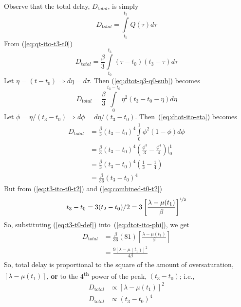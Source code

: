 \documentclass[12pt]{report}
\begin{document}
Observe that the total delay, $D_{\mathrm total}$, is simply
\begin{equation}
  \label{eq:dtot-def}
  D_{\mathrm total} = \int\limits_{t_0}^{t_3}Q(\tau)d\tau
\end{equation}
From (\ref{eq:qt-ito-t3-t0})
\begin{equation}
  \label{eq:dtot-q3-q0-sub}
  D_{\mathrm total} = \frac{\beta}{3}\int\limits_{t_0}^{t_3}(\tau-t_0)(t_3-\tau)d\tau
\end{equation}
Let $\eta = (t-t_0) \Rightarrow d\eta = d\tau$.  Then (\ref{eq:dtot-q3-q0-sub}) becomes
\begin{equation}
  \label{eq:dtot-ito-eta}
  D_{\mathrm total} = \frac{\beta}{3}\int\limits_{0}^{t_3-t_0}\eta^2(t_3-t_0-\eta)d\eta
\end{equation}
Let $\phi = \eta/(t_3-t_0) \Rightarrow d\phi = d\eta/(t_3-t_0)$.
Then~(\ref{eq:dtot-ito-eta}) becomes
\begin{equation}
  \label{eq:dtot-ito-phi}
  \begin{split}
    D_{\mathrm total} & = \frac{\beta}{3}(t_3-t_0)^4\int\limits_{0}^{1}\phi^2(1-\phi)d\phi \\
    & = \frac{\beta}{3}(t_3-t_0)^4\left(\frac{\phi^3}{3}-\frac{\phi^4}{4}\right)\Biggr\rvert_{0}^{1} \\
  & = \frac{\beta}{3}(t_3-t_0)^4\left(\frac{1}{3}-\frac{1}{4}\right) \\
  & = \frac{\beta}{36}(t_3-t_0)^4
  \end{split}
\end{equation}
But from (\ref{eq:t3-ito-t0-t2}) and (\ref{eq:combined-t0-t2})
\begin{equation}
  \label{eq:t3-t0-def}
  t_3-t_0=3(t_2-t_0)/2 = 3\left[\frac{\lambda-\mu(t_1)}{\beta}\right]^{\nicefrac{1}{2}}
\end{equation}
So, substituting (\ref{eq:t3-t0-def}) into~(\ref{eq:dtot-ito-phi}), we get
\begin{equation}
  \label{eq:dtot-ito-beta-t1}
  \begin{split}
    D_{\mathrm total} &= \frac{\beta}{36}(81)\left[\frac{\lambda-\mu(t_1)}{\beta}\right]\\
    &= \frac{9[\lambda-\mu(t_1)]^2}{4\beta}
  \end{split}
\end{equation}
So, total delay is proportional to the square of the amount of
oversaturation, $[\lambda-\mu(t_1)]$, \textbf{or} to the 4\textsuperscript{th} power of the peak, $(t_3-t_0)$; i.e.,
\begin{subequations}
  \label{dtot-final}
  \begin{align}
    D_{\mathrm total} & \propto [\lambda-\mu(t_1)]^2 \label{eq:dtot-ito-oversat}\\
    D_{\mathrm total} & \propto (t_3-t_0)^4 \label{eq:dtot-ito-peak}
  \end{align}
\end{subequations}
\end{document}
